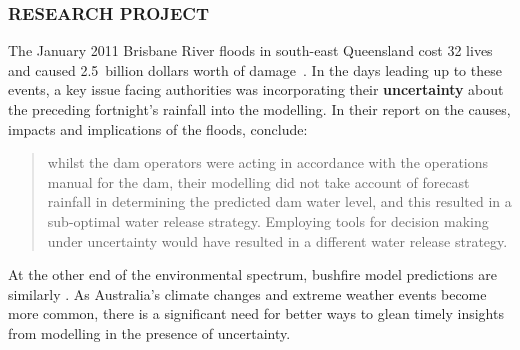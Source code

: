 \documentclass[a4paper,fontsize=12pt]{scrartcl}
\begin{document}
\subsubsection*{RESEARCH PROJECT}

The January 2011 Brisbane River floods in south-east Queensland cost
32 lives and caused 2.5~billion dollars worth of
damage~\parencite{vandenhonert_2011_2011}. In the days leading up to
these events, a key issue facing authorities was incorporating their
\textbf{uncertainty} about the preceding fortnight's rainfall into the
modelling. In their report on the causes, impacts and implications of
the floods, \textcite[p1170]{vandenhonert_2011_2011} conclude:
\blockquote{whilst the dam operators were acting in accordance with
  the operations manual for the dam, their modelling did not take
  account of forecast rainfall in determining the predicted dam water
  level, and this resulted in a sub-optimal water release strategy.
  Employing tools for decision making under uncertainty would have
  resulted in a different water release strategy.} At the other end of
the environmental spectrum, bushfire model predictions are similarly
. As Australia's climate changes and extreme weather
events become more common, there is a significant need for better ways to
glean timely insights from modelling in the presence of uncertainty.
\end{document}
